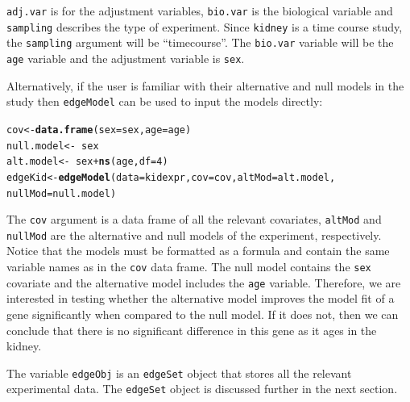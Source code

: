 \documentclass{article}\usepackage[]{graphicx}\usepackage[]{color}
\makeatletter
\newcommand{\hlnum}[1]{\textcolor[rgb]{0.686,0.059,0.569}{#1}}%
\newcommand{\hlopt}[1]{\textcolor[rgb]{0,0,0}{#1}}%
\newcommand{\hlstd}[1]{\textcolor[rgb]{0.345,0.345,0.345}{#1}}%
\newcommand{\hlkwb}[1]{\textcolor[rgb]{0.69,0.353,0.396}{#1}}%
\newcommand{\hlkwc}[1]{\textcolor[rgb]{0.333,0.667,0.333}{#1}}%
\newcommand{\hlkwd}[1]{\textcolor[rgb]{0.737,0.353,0.396}{\textbf{#1}}}%
\newenvironment{kframe}{%
 \def\at@end@of@kframe{}%
 \ifinner\ifhmode%
  \def\at@end@of@kframe{\end{minipage}}%
  \begin{minipage}{\columnwidth}%
 \fi\fi%
 \def\FrameCommand##1{\hskip\@totalleftmargin \hskip-\fboxsep
 \colorbox{shadecolor}{##1}\hskip-\fboxsep
     \hskip-\linewidth \hskip-\@totalleftmargin \hskip\columnwidth}%
 \MakeFramed {\advance\hsize-\width
   \@totalleftmargin\z@ \linewidth\hsize
   \@setminipage}}%
 {\par\unskip\endMakeFramed%
 \at@end@of@kframe}
\newenvironment{knitrout}{}{} %
\makeatother
\begin{document}
{\tt adj.var} is for the adjustment variables, {\tt bio.var} is the biological variable and {\tt sampling} describes the type of experiment. Since {\tt kidney} is a time course study, the {\tt sampling} argument will be ``timecourse''. The {\tt bio.var} variable will be the {\tt age} variable and the adjustment variable is {\tt sex}.

Alternatively, if the user is familiar with their alternative and null models in the study then {\tt edgeModel} can be used to input the models directly:
\begin{knitrout}
\color{fgcolor}\begin{kframe}
\begin{alltt}
\hlstd{cov} \hlkwb{<-} \hlkwd{data.frame}\hlstd{(}\hlkwc{sex} \hlstd{= sex,} \hlkwc{age} \hlstd{= age)}
\hlstd{null.model} \hlkwb{<-} \hlopt{~}\hlstd{sex}
\hlstd{alt.model} \hlkwb{<-} \hlopt{~}\hlstd{sex} \hlopt{+} \hlkwd{ns}\hlstd{(age,} \hlkwc{df} \hlstd{=} \hlnum{4}\hlstd{)}
\hlstd{edgeKid} \hlkwb{<-} \hlkwd{edgeModel}\hlstd{(}\hlkwc{data} \hlstd{= kidexpr,} \hlkwc{cov} \hlstd{= cov,} \hlkwc{altMod} \hlstd{= alt.model,}
    \hlkwc{nullMod} \hlstd{= null.model)}
\end{alltt}


{\ttfamily\noindent\bfseries{}}\end{kframe}
\end{knitrout}

The {\tt cov} argument is a data frame of all the relevant covariates, {\tt altMod} and {\tt nullMod} are the alternative and null models of the experiment, respectively. Notice that the models must be formatted as a formula and contain the same variable names as in the {\tt cov} data frame. The null model contains the {\tt sex} covariate and the alternative model includes the {\tt age} variable. Therefore, we are interested in testing whether the alternative model improves the model fit of a gene significantly when compared to the null model. If it does not, then we can conclude that there is no significant difference in this gene as it ages in the kidney. 

The variable {\tt edgeObj} is an {\tt edgeSet} object that stores all the relevant experimental data. The {\tt edgeSet} object is discussed further in the next section. 
\end{document}
